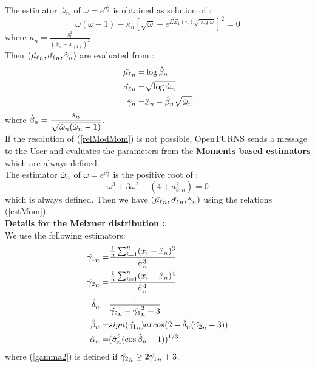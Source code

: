 {  The estimator $\Hat{\omega}_n$ of $\omega=e^{\sigma_\ell^2}$ is obtained as solution of :
  \begin{equation}\label{relModMom}
    \omega(\omega-1)-\kappa_n\left[\sqrt{\omega}-e^{EZ_{1}(n)\sqrt{\log \omega}}\right]^2 = 0
  \end{equation}
  where $\kappa_n = \frac{s_n^2}{( \bar{x}_n-x_{(1)})^2}$.\\

  Then $(\Hat{\mu_\ell}_n, \Hat{\sigma_\ell}_n, \Hat{\gamma}_n)$ are evaluated from :
  \begin{align}\label{estMom}
    \Hat{\mu_\ell}_n = & \log \Hat{\beta}_n \nonumber \\
    \Hat{\sigma_\ell}_n = & \sqrt{\log \Hat{\omega}_n}\nonumber \\
    \Hat{\gamma}_n = & \bar{x}_n-\Hat{\beta}_n\sqrt{\Hat{\omega}_n}
  \end{align}
  where $\displaystyle \Hat{\beta}_n = \frac{s_n}{\sqrt{\Hat{\omega}_n(\Hat{\omega}_n-1)}}$.\\

  If the resolution of (\ref{relModMom}) is not possible, OpenTURNS sends a message to the User and evaluates the parameters from the {\bf Moments  based estimators} which are always defined. \\
  The estimator $\Hat{\omega}_n$ of $\omega=e^{\sigma_\ell^2}$ is the positive root of :
  \begin{equation}
    \omega^3+3\omega^2-(4+a_{3,n}^2)=0
  \end{equation}
  which is always defined. Then we have $(\Hat{\mu_\ell}_n, \Hat{\sigma_\ell}_n, \Hat{\gamma}_n)$ using the relations (\ref{estMom}).\\


  {\bf Details for the Meixner distribution :} \\

  We use the following estimators:
  \begin{align}
    \Hat{\gamma_1}_n =     &  \frac{\frac{1}{n}\sum_{i=1}^{n} (x_i-\Hat{x}_n)^3}{\Hat{\sigma}_n^3}\\
    \Hat{\gamma_2}_n =     &  \frac{\frac{1}{n}\sum_{i=1}^{n} (x_i-\Hat{x}_n)^4}{\Hat{\sigma}_n^4} \\ \label{gamma2}
    \Hat{\delta}_n =     & \frac{1}{\Hat{\gamma_2}_n-\Hat{\gamma_1}_n^2-3}\\
    \Hat{\beta}_n =     & sign(\Hat{\gamma_1}_n)arcos( 2-\Hat{\delta}_n (\Hat{\gamma_2}_n-3))\\
    \Hat{\alpha}_n =     & (\Hat{\sigma}_n^2(\cos\Hat{\beta}_n+1) )^{1/3}
  \end{align}
  where (\ref{gamma2}) is defined if $\Hat{\gamma_2}_n \geq 2\Hat{\gamma_1}_n +3$.

}
